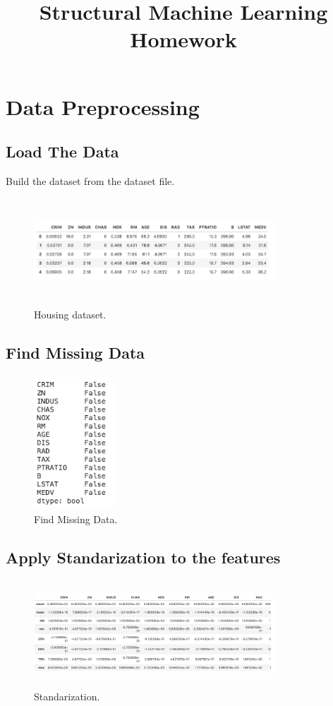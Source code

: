 \documentclass[conference]{IEEEtran}
\begin{document}
\title{Structural Machine Learning Homework}
\author{}

\maketitle

\section{Data Preprocessing}
\subsection{Load The Data}
Build the dataset from the dataset file.
\begin{figure}[htbp]
\centerline{\includegraphics[width=9cm, height=4cm]{1.png}}
\caption{Housing dataset.}
\label{1}
\end{figure}
\subsection{Find Missing Data}
\begin{figure}[htbp]
\centerline{\includegraphics[width=3cm, height=5cm]{2.png}}
\caption{Find Missing Data.}
\label{2}
\end{figure}
\subsection{Apply Standarization to the features}
\begin{figure}[htbp]
\centerline{\includegraphics[width=9cm, height=4cm]{3.png}}
\caption{Standarization.}
\label{3}
\end{figure}
\end{document}

